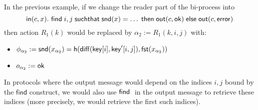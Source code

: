 \begin{example}
  In the previous example, if we change the reader part of the bi-process into
  $$\mathsf{in}(c,x).~ \textsf{find}\; i,j \;\textsf{suchthat}\; \mathsf{snd}(x) = \ldots \;\textsf{then}\;
  \mathsf{out}(c,\mathsf{ok}) \;\textsf{else}\; \mathsf{out}(c,\mathsf{error})$$
  then action $R_1(k)$ would be replaced by $\alpha_2 := R_1(k,i,j)$
  with:
  \begin{itemize}
    \item $\phi_{\alpha_2} := \mathsf{snd}(x_{\alpha_2}) =
      \mathsf{h}(\mathsf{diff}(\mathsf{key}[i],\mathsf{key}'[i,j]),\mathsf{fst}(x_{\alpha_2}))$
    \item $o_{\alpha_2} := \mathsf{ok}$
  \end{itemize}
  In protocols where the output message would depend on the indices $i,j$
  bound by the $\mathsf{find}$ construct, we would also use $\textsf{find}\;$ in the
  output message to retrieve these indices (more precisely, we would retrieve
  the first such indices).
\end{example}

